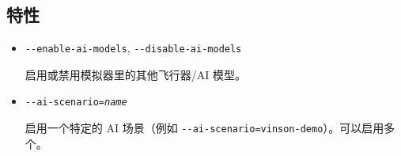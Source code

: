 \begin{itemize}
{\begin{itemize}
  \end{itemize}
}

\ifchinese
{
  \subsection{特性}
\begin{itemize}

\item{\texttt{-$ $-enable-ai-models}, \texttt{-$ $-disable-ai-models}}
 
  启用或禁用模拟器里的其他飞行器/AI 模型。

\item{\texttt{-$ $-ai-scenario={\it name}}}

  启用一个特定的 AI 场景（例如 \texttt{-$ $-ai-scenario=vinson-demo}）。可以启用多个。

\end{itemize}
}
\fi






\end{itemize}
